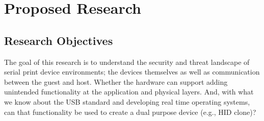 \chapter{\leavevmode Proposed Research}
\label{chap:proposedresearch}



\section{Research Objectives }  \label{researchobjectives}

The goal of this research is to understand the security and threat landscape of serial print device environments; the devices themselves as well as communication between the guest and host. Whether the hardware can support adding unintended functionality at the application and physical layers. And, with what we know about the USB standard and developing real time operating systems, can that functionality be used to create a dual purpose device (e.g., HID clone)?





